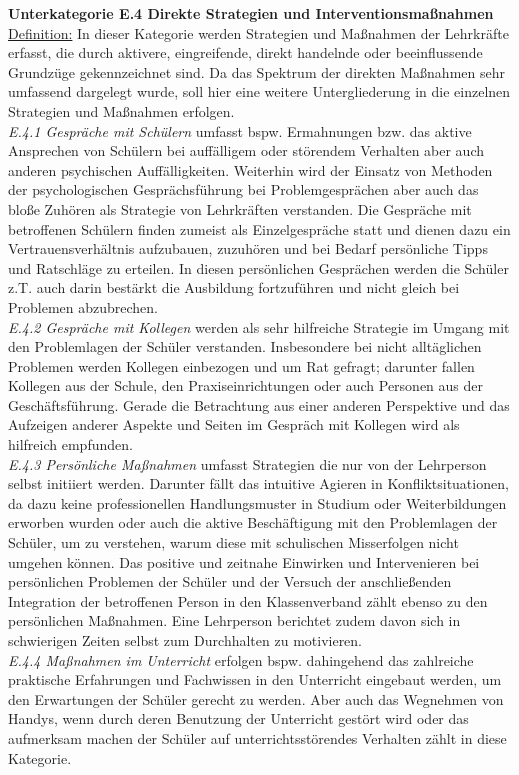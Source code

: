 \textbf{Unterkategorie E.4 Direkte Strategien und Interventionsmaßnahmen}\\
\underline{Definition:} In dieser Kategorie werden Strategien und Maßnahmen der Lehrkräfte erfasst, die durch aktivere, eingreifende, direkt handelnde oder beeinflussende Grundzüge gekennzeichnet sind. Da das Spektrum der direkten Maßnahmen sehr umfassend dargelegt wurde, soll hier eine weitere Untergliederung in die einzelnen Strategien und Maßnahmen erfolgen.\\
\textit{E.4.1 Gespräche mit Schülern} umfasst bspw. Ermahnungen bzw. das aktive Ansprechen von Schülern bei auffälligem oder störendem Verhalten aber auch anderen psychischen Auffälligkeiten. Weiterhin wird der Einsatz von Methoden der psychologischen Gesprächsführung bei Problemgesprächen aber auch das bloße Zuhören als Strategie von Lehrkräften verstanden. Die Gespräche mit betroffenen Schülern finden zumeist als Einzelgespräche statt und dienen dazu ein Vertrauensverhältnis aufzubauen, zuzuhören und bei Bedarf persönliche Tipps und Ratschläge zu erteilen. In diesen persönlichen Gesprächen werden die Schüler z.T. auch darin bestärkt die Ausbildung fortzuführen und nicht gleich bei Problemen abzubrechen.\\
\textit{E.4.2 Gespräche mit Kollegen} werden als sehr hilfreiche Strategie im Umgang mit den Problemlagen der Schüler verstanden. Insbesondere bei nicht alltäglichen Problemen werden Kollegen einbezogen und um Rat gefragt; darunter fallen Kollegen aus der Schule, den Praxiseinrichtungen oder auch Personen aus der Geschäftsführung. Gerade die Betrachtung aus einer anderen Perspektive und das Aufzeigen anderer Aspekte und Seiten im Gespräch mit Kollegen wird als hilfreich empfunden.\\
\textit{E.4.3 Persönliche Maßnahmen} umfasst Strategien die nur von der Lehrperson selbst initiiert werden. Darunter fällt das intuitive Agieren in Konfliktsituationen, da dazu keine professionellen Handlungsmuster in Studium oder Weiterbildungen erworben wurden oder auch die aktive Beschäftigung mit den Problemlagen der Schüler, um zu verstehen, warum diese mit schulischen Misserfolgen nicht umgehen können. Das positive und zeitnahe Einwirken und Intervenieren bei persönlichen Problemen der Schüler und der Versuch der anschließenden Integration der betroffenen Person in den Klassenverband zählt ebenso zu den persönlichen Maßnahmen. Eine Lehrperson berichtet zudem davon sich in schwierigen Zeiten selbst zum Durchhalten zu motivieren.\\
\textit{E.4.4 Maßnahmen im Unterricht} erfolgen bspw. dahingehend das zahlreiche praktische Erfahrungen und Fachwissen in den Unterricht eingebaut werden, um den Erwartungen der Schüler gerecht zu werden. Aber auch das Wegnehmen von Handys, wenn durch deren Benutzung der Unterricht gestört wird oder das aufmerksam machen der Schüler auf unterrichtsstörendes Verhalten zählt in diese Kategorie.\\

